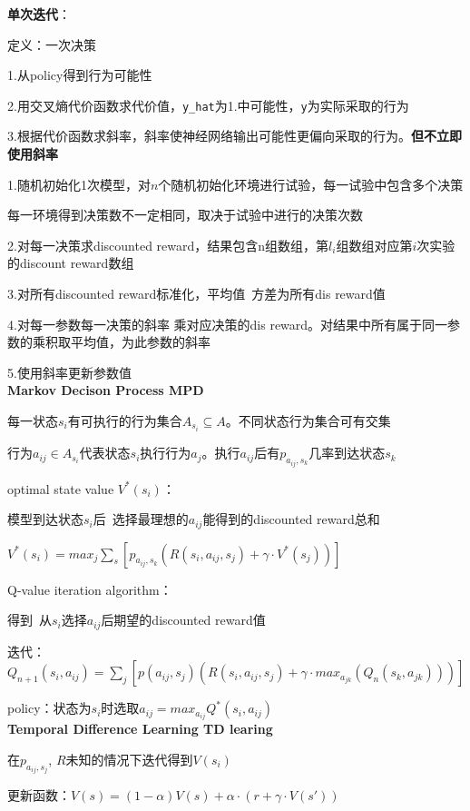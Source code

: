 \documentclass[UTF8]{ctexart}
\begin{document}
  \textbf{单次迭代}：

  \quad 定义：一次决策

  \quad \quad 1.从policy得到行为可能性

  \quad \quad 2.用交叉熵代价函数求代价值，\texttt{y\_hat}为1.中可能性，\texttt{y}为实际采取的行为

  \quad \quad 3.根据代价函数求斜率，斜率使神经网络输出可能性更偏向采取的行为。\textbf{但不立即使用斜率}

  \quad 1.随机初始化1次模型，对$n$个随机初始化环境进行试验，每一试验中包含多个决策
  
  \quad \quad 每一环境得到决策数不一定相同，取决于试验中进行的决策次数

  \quad 2.对每一决策求discounted reward，结果包含n组数组，第$l_i$组数组对应第$i$次实验的discount reward数组

  \quad 3.对所有discounted reward标准化，平均值\ 方差为所有dis reward值
  
  \quad 4.对每一参数每一决策的斜率 乘对应决策的dis reward。对结果中所有属于同一参数的乘积取平均值，为此参数的斜率

  \quad 5.使用斜率更新参数值\\
\textbf{Markov Decison Process MPD}

  每一状态$s_i$有可执行的行为集合$A_{s_i} \subseteq A$。不同状态行为集合可有交集

  行为$a_{ij} \in A_{s_i}$代表状态$s_i$执行行为$a_j$。执行$a_{ij}$后有$p_{a_{ij}, s_k}$几率到达状态$s_k$

  optimal state value $V^*(s_i)$：
  
  \quad 模型到达状态$s_i$后\ 选择最理想的$a_{ij}$能得到的discounted reward总和

  \quad $V^*(s_i) = max_j \sum_s [p_{a_{ij}, s_k} (R(s_i, a_{ij}, s_j) + \gamma \cdot V^*(s_j))]$
  
  Q-value iteration algorithm：

  \quad 得到\ 从$s_i$选择$a_{ij}$后期望的discounted reward值

  \quad 迭代：$Q_{n+1}(s_i, a_{ij}) = \sum_j [p(a_{ij}, s_j) (R(s_i, a_{ij}, s_j) + \gamma \cdot max_{a_{jk}} (Q_n(s_k, a_{jk})))]$
  
  policy：状态为$s_i$时选取$a_{ij} = max_{a_{ij}} Q^*(s_i, a_{ij})$\\
\textbf{Temporal Difference Learning TD learing}

  在$p_{a_{ij}, s_j}$, $R$未知的情况下迭代得到$V(s_i)$
  
  更新函数：$V(s) = (1-\alpha)V(s) + \alpha \cdot (r + \gamma \cdot V(s'))$
  
\end{document}

